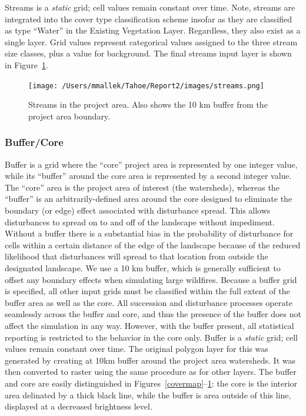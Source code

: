 Streams is a \emph{static} grid; cell values remain constant over time. Note, streams are integrated into the cover type classification scheme insofar as they are classified as type ``Water'' in the Existing Vegetation Layer. Regardless, they also exist as a single layer. Grid values represent categorical values assigned to the three stream size classes, plus a value for background. The final streams input layer is shown in Figure~\ref{streamsmap}.

\begin{figure}[htbp]
\centering
\texttt{[image: /Users/mmallek/Tahoe/Report2/images/streams.png]}
\caption{Streams in the project area. Also shows the 10 km buffer from the project area boundary.} 
\label{streamsmap}
\end{figure}

\subsubsection{Buffer/Core} 
Buffer is a grid where the ``core'' project area is represented by one integer value, while its ``buffer'' around the core area is represented by a second integer value. The ``core'' area is the project area of interest (the watersheds), whereas the ``buffer'' is an arbitrarily-defined area around the core designed to eliminate the boundary (or edge) effect associated with disturbance spread. This allows disturbances to spread on to and off of the landscape without impediment. Without a buffer there is a substantial bias in the probability of disturbance for cells within a certain distance of the edge of the landscape because of the reduced likelihood that disturbances will spread to that location from outside the designated landscape. We use a 10 km buffer, which is generally sufficient to offset any boundary effects when simulating large wildfires. Because a buffer grid is specified, all other input grids must be classified within the full extent of the buffer area as well as the core. All succession and disturbance processes operate seamlessly across the buffer and core, and thus the presence of the buffer does not affect the simulation in any way. However, with the buffer present, all statistical reporting is restricted to the behavior in the core only. Buffer is a \emph{static} grid; cell values remain constant over time. The original polygon layer for this was generated by creating at 10km buffer around the project area watersheds. It was then converted to raster using the same procedure as for other layers. The buffer and core are easily distinguished in Figures~\ref{covermap}--\ref{streamsmap}: the core is the interior area delinated by a thick black line, while the buffer is area outside of this line, displayed at a decreased brightness level.




